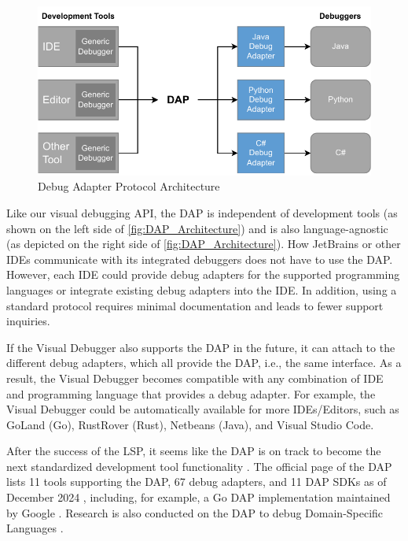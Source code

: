 \documentclass[sigconf]{acmart}
\begin{document}
\begin{figure}[ht]
  \centering
  \includegraphics[width=1\linewidth]{images/visual-debugger-DAP-architecture.pdf}
  \caption{Debug Adapter Protocol Architecture \cite{microsoftDebugAdapterProtocol2023}}
  \label{fig:DAP_Architecture}
\end{figure}

Like our visual debugging API, the DAP is independent of development tools (as shown on the left side of \autoref{fig:DAP_Architecture}) and is also language-agnostic (as depicted on the right side of \autoref{fig:DAP_Architecture}).
How JetBrains or other IDEs communicate with its integrated debuggers does not have to use the DAP.
However, each IDE could provide debug adapters for the supported programming languages or integrate existing debug adapters into the IDE.
In addition, using a standard protocol requires minimal documentation and leads to fewer support inquiries.

If the Visual Debugger also supports the DAP in the future, it can attach to the different debug adapters, which all provide the DAP, i.e., the same interface.
As a result, the Visual Debugger becomes compatible with any combination of IDE and programming language that provides a debug adapter.
For example, the Visual Debugger could be automatically available for more IDEs/Editors, such as GoLand (Go), RustRover (Rust), Netbeans (Java), and Visual Studio Code.

After the success of the LSP, it seems like the DAP is on track to become the next standardized development tool functionality \cite{raskVisualStudioCode2020,borkLanguageServerProtocol2023}.
The official page of the DAP lists 11 tools supporting the DAP, 67 debug adapters, and 11 DAP SDKs as of December 2024 \cite{microsoftDebugAdapterProtocol2023}, including, for example, a Go DAP implementation maintained by Google \cite{googleGoImplementationDebug2023}.
Research is also conducted on the DAP to debug Domain-Specific Languages \cite{jeanjeanIDECodeReifying2021,enetProtocolBasedInteractiveDebugging2023}.
\end{document}

